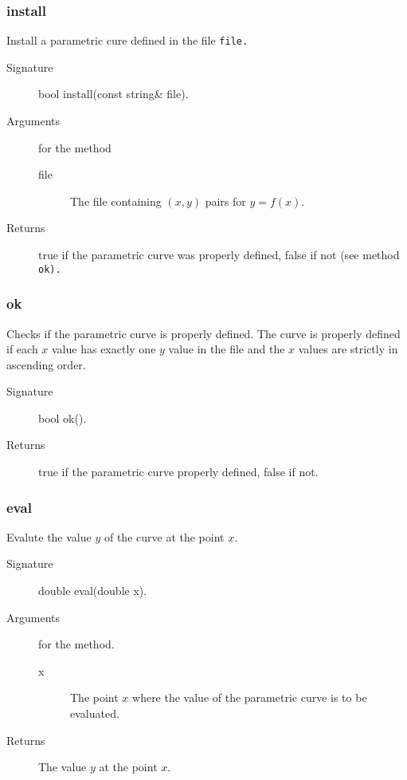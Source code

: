\subsubsection{install}
Install a parametric cure defined in the file \tt file\rm.
 \begin{description}
    \item [Signature] bool install(const string\& file).
    \item [Arguments] for the method
       \begin{description}
         \item[file] The file containing  $(x,y)$ pairs for $y =
    	f(x)$.
        \end{description} 
    \item [Returns] true if the parametric curve was properly defined,
        	               false if not (see method \tt ok\rm).
 \end{description} 


\subsubsection{ok} 
Checks if the parametric curve is properly defined. The curve is 
properly defined if each $x$ value has exactly one $y$ value in the file and
the $x$ values are strictly in ascending order.
   \begin{description}
    \item [Signature] bool ok().
    \item [Returns] true if  the parametric curve properly defined,
                       false if not. 
   \end{description} 

\subsubsection{eval}
Evalute the value $y$  of the curve at the point $x$.
\begin{description}  
    \item [Signature] double eval(double x).
    \item [Arguments] for the method.
      \begin{description}
        \item [x] The point $x$ where the value of the parametric curve 
                  is to be evaluated.
       \end{description}
    \item [Returns] The value $y$ at the point $x$.
\end{description} 

